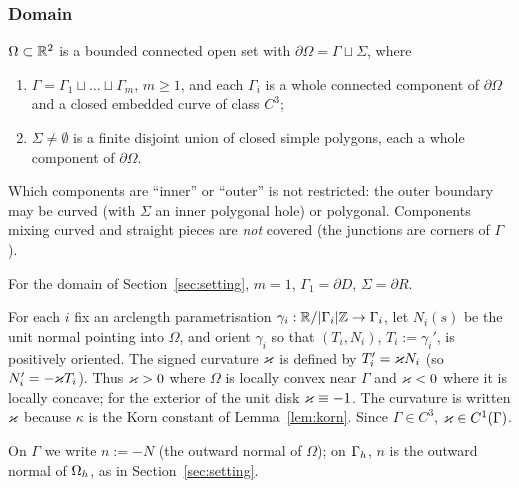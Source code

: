 \subsubsection{Domain}
\begin{assumption}[Domain]\label{gd:ass:domain}
$\Omega\subset\mathbb R^2$ is a bounded connected open set with $\partial\Omega=\Gamma\sqcup\Sigma$, where
\begin{enumerate}[label=(\alph*)]
\item $\Gamma=\Gamma_1\sqcup\dots\sqcup\Gamma_m$, $m\ge1$, and each $\Gamma_i$ is a whole connected component of $\partial\Omega$ and a closed embedded curve of class $C^3$;
\item $\Sigma\neq\emptyset$ is a finite disjoint union of closed simple polygons, each a whole component of $\partial\Omega$.
\end{enumerate}
Which components are ``inner'' or ``outer'' is not restricted: the outer boundary may be curved (with $\Sigma$ an inner polygonal hole) or polygonal. Components mixing curved and straight pieces are \emph{not} covered (the junctions are corners of $\Gamma$).
\end{assumption}
For the domain of Section~\ref{sec:setting}, $m=1$, $\Gamma_1=\partial D$, $\Sigma=\partial R$.

For each $i$ fix an arclength parametrisation $\gamma_i:\mathbb R/|\Gamma_i|\mathbb Z\to\Gamma_i$, let $N_i(s)$ be the unit normal pointing into $\Omega$, and orient $\gamma_i$ so that $(T_i,N_i)$, $T_i:=\gamma_i'$, is positively oriented. The signed curvature $\varkappa$ is defined by $T_i'=\varkappa N_i$ (so $N_i'=-\varkappa T_i$). Thus $\varkappa>0$ where $\Omega$ is locally convex near $\Gamma$ and $\varkappa<0$ where it is locally concave; for the exterior of the unit disk $\varkappa\equiv-1$. The curvature is written $\varkappa$ because $\kappa$ is the Korn constant of Lemma~\ref{lem:korn}. Since $\Gamma\in C^3$, $\varkappa\in C^1(\Gamma)$.

On $\Gamma$ we write $n:=-N$ (the outward normal of $\Omega$); on $\Gamma_h$, $n$ is the outward normal of $\Omega_h$, as in Section~\ref{sec:setting}.

